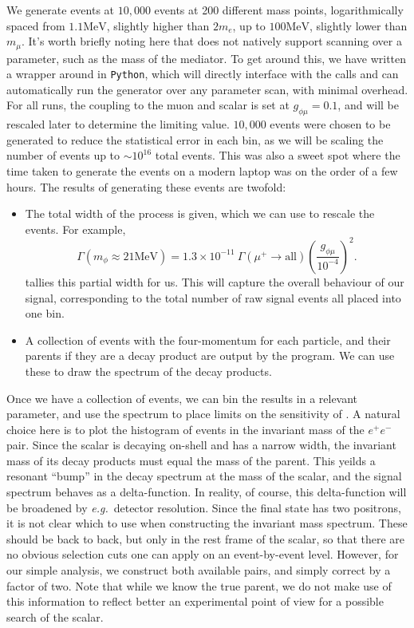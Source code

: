 We generate events at $10,000$ events at 200 different mass points, logarithmically spaced from $1.1\textrm{MeV}$, slightly higher than $2m_e$, up to $100\textrm{MeV}$, slightly lower than $m_\mu$.
It's worth briefly noting here that \madgraph does not natively support scanning over a parameter, such as the mass of the mediator.
To get around this, we have written a wrapper around \madgraph in \texttt{Python}, which will directly interface with the \madgraph calls and can automatically run the generator over any parameter scan, with minimal overhead.
For all runs, the coupling to the muon and scalar is set at $g_{\phi\mu} = 0.1$, and will be rescaled later to determine the limiting value.
$10,000$ events were chosen to be generated to reduce the statistical error in each bin, as we will be scaling the number of events up to $\sim 10^{16}$ total events.
This was also a sweet spot where the time taken to generate the events on a modern laptop was on the order of a few hours.
The results of generating these events are twofold:
\begin{itemize}
    \item{The total width of the process is given, which we can use to rescale the events. For example,
        \begin{equation}
            \Gamma(m_\phi \approx 21\textrm{MeV}) = 1.3\times 10^{-11}~\Gamma(\mu^+ \rightarrow \textrm{all}) \left(\frac{g_{\phi\mu}}{10^{-4}}\right)^2\textrm{.}
        \end{equation}
        \madgraph tallies this partial width for us. This will capture the overall behaviour of our signal, corresponding to the total number of raw signal events all placed into one bin.}
    \item{A collection of events with the four-momentum for each particle, and their parents if they are a decay product are output by the program. We can use these to draw the spectrum of the decay products.}
\end{itemize}

Once we have a collection of events, we can bin the results in a relevant parameter, and use the spectrum to place limits on the sensitivity of \mueee.
A natural choice here is to plot the histogram of events in the invariant mass of the $e^+ e^-$ pair.
Since the scalar is decaying on-shell and has a narrow width, the invariant mass of its decay products must equal the mass of the parent.
This yeilds a resonant ``bump'' in the decay spectrum at the mass of the scalar, and the signal spectrum behaves as a delta-function.
In reality, of course, this delta-function will be broadened by {\em e.g.}\ detector resolution.
Since the final state has two positrons, it is not clear which to use when constructing the invariant mass spectrum.
These should be back to back, but only in the rest frame of the scalar, so that there are no obvious selection cuts one can apply on an event-by-event level.
However, for our simple analysis, we construct both available pairs, and simply correct by a factor of two.
Note that while we know the true parent, we do not make use of this information to reflect better an experimental point of view for a possible search of the scalar.

